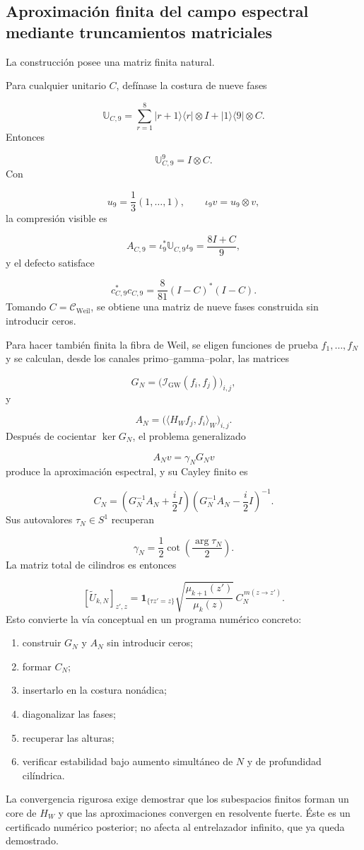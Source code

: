 \subsection{Aproximación finita del campo espectral mediante truncamientos matriciales}
La construcción posee una matriz finita natural.\par
Para cualquier unitario \(C\), defínase la costura de nueve fases\par
\[
\mathbb U_{C,9}
=
\sum_{r=1}^{8}
|r+1\rangle\langle r|\otimes I
+
|1\rangle\langle9|\otimes C.
\]
Entonces\par
\[
\mathbb U_{C,9}^9
=
I\otimes C.
\]
Con\par
\[
u_9=\frac1{3}(1,\ldots,1),
\qquad
\iota_9v=u_9\otimes v,
\]
la compresión visible es\par
\[
A_{C,9}
=
\iota_9^*\mathbb U_{C,9}\iota_9
=
\frac{8I+C}{9},
\]
y el defecto satisface\par
\[
c_{C,9}^*c_{C,9}
=
\frac{8}{81}
(I-C)^*(I-C).
\]
Tomando \(C=\mathcal C_{\mathrm{Weil}}\), se obtiene una matriz de nueve fases construida sin introducir ceros.\par
Para hacer también finita la fibra de Weil, se eligen funciones de prueba \(f_1,\ldots,f_N\) y se calculan, desde los canales primo–gamma–polar, las matrices\par
\[
G_N
=
\bigl(
\mathscr I_{\mathrm{GW}}(f_i,f_j)
\bigr)_{i,j},
\]
y\par
\[
A_N
=
\bigl(
\langle H_Wf_j,f_i\rangle_W
\bigr)_{i,j}.
\]
Después de cocientar \(\ker G_N\), el problema generalizado\par
\[
A_Nv=\gamma_NG_Nv
\]
produce la aproximación espectral, y su Cayley finito es\par
\[
C_N
=
\left(
G_N^{-1}A_N+\frac{i}{2}I
\right)
\left(
G_N^{-1}A_N-\frac{i}{2}I
\right)^{-1}.
\]
Sus autovalores \(\tau_N\in S^1\) recuperan\par
\[
\gamma_N
=
\frac12
\cot\left(
\frac{\arg\tau_N}{2}
\right).
\]
La matriz total de cilindros es entonces\par
\[
[\widetilde U_{k,N}]_{z',z}
=
\mathbf1_{\{\tau z'=z\}}
\sqrt{\frac{\mu_{k+1}(z')}{\mu_k(z)}}
\,C_N^{\,m(z\to z')}.
\]
Esto convierte la vía conceptual en un programa numérico concreto:\par
\begin{enumerate}
\item construir \(G_N\) y \(A_N\) sin introducir ceros;
\item formar \(C_N\);
\item insertarlo en la costura nonádica;
\item diagonalizar las fases;
\item recuperar las alturas;
\item verificar estabilidad bajo aumento simultáneo de \(N\) y de profundidad cilíndrica.
\end{enumerate}
La convergencia rigurosa exige demostrar que los subespacios finitos forman un core de \(H_W\) y que las aproximaciones convergen en resolvente fuerte. Éste es un certificado numérico posterior; no afecta al entrelazador infinito, que ya queda demostrado.\par
{}
